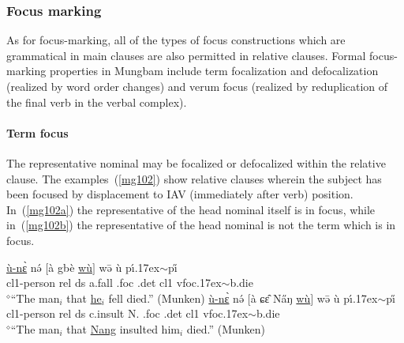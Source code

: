 \documentclass[10pt,twoside]{article}
\makeatletter
\newcommand{\cl}[1]{{\sc cl#1}}
\def\elicited{$^\diamond$}
\def\til{\raise.17ex\hbox{$\scriptstyle\mathtt{\sim}$}}	%
\renewcommand{\i}{ı}
\def\@{ə}
\def\eh{ɛ}
\def\ng{ŋ}
\def\sh{ɕ}
\makeatother
\begin{document}
\subsubsection{Focus marking}\label{secMungbamFocusFocus}
As for focus-marking, all of the types of focus constructions which are 
grammatical in main clauses are
also permitted in relative clauses. 
Formal focus-marking properties
in Mungbam include term focalization and defocalization (realized by
word order changes) and verum focus (realized by reduplication 
of the final verb in the verbal complex). 
%
%

%
\paragraph{Term focus}
The representative nominal may be focalized or defocalized within the relative clause. 
The examples~(\ref{mg102}) show
relative clauses wherein the subject has been focused by displacement
to IAV (immediately after verb) position. In~(\ref{mg102a}) the representative of the head
nominal itself is in focus, while in~(\ref{mg102b}) the representative
of the head nominal is not the term which is in focus.
%
\begin{exe}
\ex	\label{mg102}
\begin{xlist}
\ex \gll \uline{\`u-n\`{\eh}} n\'{\@} $[$\`a gb\`e \uline{w\`u}$]$ w\={\@} \`u p\'\i{\til}p\H{\i}	\\
\cl1-person {\sc rel} {\sc ds} a.fall {\sc \cl1.foc} {\sc \cl1.det} \cl1 {\sc vfoc}\til{b.die}	\\
\glt \elicited``The man$_i$ that \uline{he$_i$} fell died.'' (Munken)	\label{mg102a}
\ex	\gll \uline{\`u-n\`{\eh}} n\'{\@} $[$\`a \sh\^{\eh} N\H{a}{\ng} \uline{w\`u}$]$ w\={\@}  \`u p\'\i{\til}p\H{\i}	\\
\cl1-person {\sc rel} {\sc ds} c.insult N. {\sc \cl1.foc} {\sc \cl1.det} \cl1 {\sc vfoc}\til{b.die}	\\
\glt \elicited``The man$_i$ that \uline{Nang} insulted him$_i$ died.'' (Munken)	\label{mg102b}
\end{xlist}
\end{exe}
%
\end{document}
